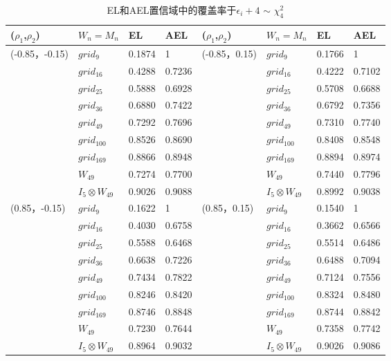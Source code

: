 \documentclass[onecolumn]{ctexart}	%
\begin{document}

\begin{table}[H]
\setlength{\abovecaptionskip}{0cm}
\centering
\caption{EL和AEL置信域中的覆盖率于$\epsilon_{i}+4$ $\sim$ $\chi^2_4$}
\begin{tabular*}{\hsize}{@{}@{\extracolsep{\fill}}llllllll@{}}
\hline
($\rho_{1}$,$\rho_{2}$)&$W_n=M_n$ & EL&AEL&($\rho_{1}$,$\rho_{2}$)&$W_n=M_n$ & EL&AEL\\
\hline
(-0.85，-0.15)& $grid_{9}$  	& 0.1874 & 1           &  (-0.85，0.15)	& $grid_{9}$ & 0.1766 & 1   \\
		& $grid_{16}$   	& 0.4288 & 0.7236 	&                 		& $grid_{16}$  & 0.4222 & 0.7102 \\
		& $grid_{25}$   	& 0.5888 & 0.6928 	&                 		& $grid_{25}$  & 0.5708 & 0.6688 \\
		& $grid_{36}$   	& 0.6880 & 0.7422 	&                	 	& $grid_{36}$  & 0.6792 & 0.7356\\
		& $grid_{49}$   	& 0.7292 & 0.7696	&                 		& $grid_{49}$  & 0.7310 & 0.7740\\
                      & $grid_{100}$ 	& 0.8526 & 0.8690 	&                 		& $grid_{100}$ & 0.8408 & 0.8548\\
                      & $grid_{169}$ 	& 0.8866 & 0.8948 	&                 		& $grid_{169}$ & 0.8894 & 0.8974 \\
                      & $W_{49}$ 	&  0.7274 & 0.7700&                 		&  $W_{49}$ & 0.7440 & 0.7796 \\
                      & $I_{5}\otimes W_{49}$& 0.9026 &0.9088   	&     &$I_{5}\otimes W_{49}$&0.8992 &0.9038   \\
\hline
(0.85，-0.15) & $grid_{9}$   	& 0.1622 & 1           &  (0.85，0.15)	& $grid_{9}$  & 0.1540 & 1\\
		& $grid_{16}$   	& 0.4030 & 0.6758	&                 		& $grid_{16}$ & 0.3662 & 0.6566\\
		& $grid_{25}$   	& 0.5588 & 0.6468	&                 		& $grid_{25}$ & 0.5514 & 0.6486\\
		& $grid_{36}$   	& 0.6638 & 0.7226  &                 		& $grid_{36}$ & 0.6488 & 0.7094 \\
		& $grid_{49}$   	& 0.7434 & 0.7822  &                  		& $grid_{49}$ & 0.7124 & 0.7556\\
                      & $grid_{100}$ 	& 0.8246 & 0.8420  &                 		& $grid_{100}$ & 0.8324 & 0.8480\\
                      & $grid_{169}$ 	& 0.8746 & 0.8848  &                 		& $grid_{169}$ & 0.8744 & 0.8842  \\
                      & $W_{49}$ 	&  0.7230 & 0.7644&                 		&  $W_{49}$ &  0.7358 & 0.7742    \\
                      & $I_{5}\otimes W_{49}$& 0.8964 &0.9032	&     &$I_{5}\otimes W_{49}$&0.9026 &0.9086   \\
\hline
\end{tabular*}
\end{table}
\end{document}
